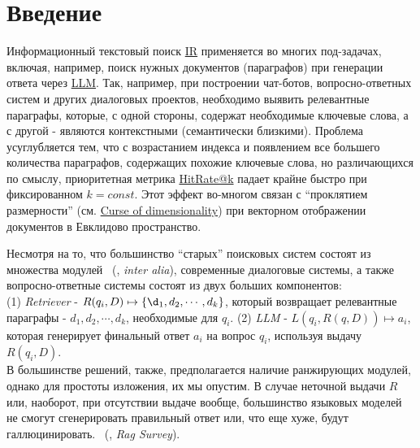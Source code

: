 
\section{Введение}

\label{sec:intro}

Информационный текстовый поиск \href{https://en.wikipedia.org/wiki/Information_retrieval}{IR} применяется во многих под-задачах, включая, 
например, поиск нужных документов (параграфов) при генерации ответа через \href{https://en.wikipedia.org/wiki/Large_language_model}{LLM}. 
Так, например, при построении чат-ботов, вопросно-ответных систем и других диалоговых проектов, необходимо выявить релевантные параграфы, которые, с одной стороны,
содержат необходимые ключевые слова, а с другой - являются контекстными (семантически близкими). Проблема усуглубляется тем, что с возрастанием индекса и появлением все большего количества 
параграфов, содержащих похожие ключевые слова, но различающихся по смыслу, приоритетная метрика \href{https://en.wikipedia.org/wiki/Evaluation_measures_(information_retrieval)}{HitRate@k} падает крайне быстро при фиксированном $k=const$. 
Этот эффект во-многом связан с ``проклятием размерности'' (см. \href{https://en.wikipedia.org/wiki/Curse_of_dimensionality}{Curse of dimensionality}) при векторном отображении документов в Евклидово пространство.


Несмотря на  то, что большинство ``старых'' поисковых систем состоят из множества модулей ~(\citet{ferrucci2012introduction,moldovan2003performance}, \textit{inter alia}),
современные диалоговые системы, а также вопросно-ответные системы состоят из двух больших компонентов: \\
(1) \emph{Retriever} - $R(q_i, D) \mapsto \{\d_1, d_2, \cdots, d_k\}$, который 
возвращает релевантные параграфы - $d_1, d_2, \cdots, d_k$, необходимые для $q_i$.
\newline
(2) \emph{LLM} - $L(q_i, R(q, D)) \mapsto a_i$, которая генерирует финальный ответ $a_i$ на вопрос $q_i$, используя выдачу $R(q_i, D)$.\\
В большинстве решений, также, предполагается наличие ранжирующих модулей, однако для простоты изложения, их мы опустим. В случае неточной выдачи $R$ или, наоборот, при отсутствии выдаче вообще, большинство языковых моделей не смогут сгенерировать правильный ответ или, что еще хуже, будут галлюцинировать. ~(\citet{ragsurvey}, \textit{Rag Survey}).

